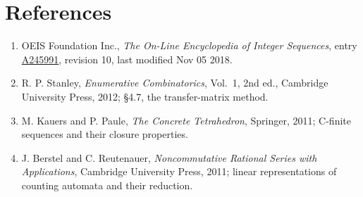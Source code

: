 \documentclass[11pt]{article}
\theoremstyle{definition}
\begin{document}
\section{References}

\begin{enumerate}

\item OEIS Foundation Inc., \emph{The On-Line Encyclopedia of Integer Sequences}, entry \href{https://oeis.org/A245991}{A245991}, revision 10, last modified Nov 05 2018.

\item R. P. Stanley, \emph{Enumerative Combinatorics}, Vol.~1, 2nd ed., Cambridge University Press, 2012; \S4.7, the transfer-matrix method.

\item M. Kauers and P. Paule, \emph{The Concrete Tetrahedron}, Springer, 2011; C-finite sequences and their closure properties.

\item J. Berstel and C. Reutenauer, \emph{Noncommutative Rational Series with Applications}, Cambridge University Press, 2011; linear representations of counting automata and their reduction.

\end{enumerate}
\end{document}
